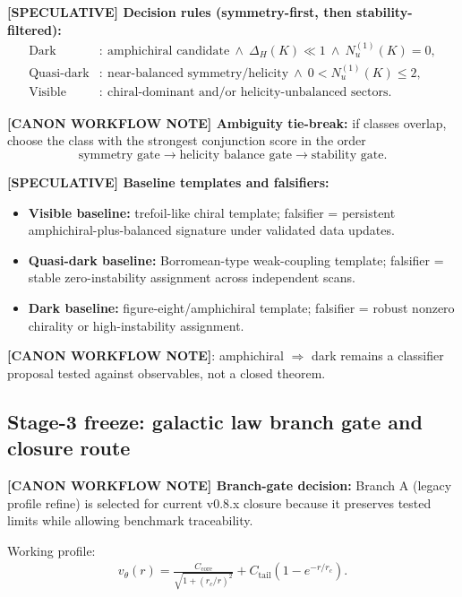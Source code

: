 \textbf{[SPECULATIVE] Decision rules (symmetry-first, then stability-filtered):}
\begin{align}
    \text{Dark}
    &:\ \text{amphichiral candidate}
    \ \wedge\
    \Delta_H(K)\ll 1
    \ \wedge\
    N_u^{(1)}(K)=0,\\
    \text{Quasi-dark}
    &:\ \text{near-balanced symmetry/helicity}
    \ \wedge\
    0 < N_u^{(1)}(K)\le 2,\\
    \text{Visible}
    &:\ \text{chiral-dominant and/or helicity-unbalanced sectors}.
\end{align}

\textbf{[CANON WORKFLOW NOTE] Ambiguity tie-break:}
if classes overlap, choose the class with the strongest conjunction score in the order
\[
\text{symmetry gate} \rightarrow \text{helicity balance gate} \rightarrow \text{stability gate}.
\]

\textbf{[SPECULATIVE] Baseline templates and falsifiers:}
\begin{itemize}
    \item \textbf{Visible baseline:} trefoil-like chiral template; falsifier = persistent amphichiral-plus-balanced signature under validated data updates.
    \item \textbf{Quasi-dark baseline:} Borromean-type weak-coupling template; falsifier = stable zero-instability assignment across independent scans.
    \item \textbf{Dark baseline:} figure-eight/amphichiral template; falsifier = robust nonzero chirality or high-instability assignment.
\end{itemize}

\textbf{[CANON WORKFLOW NOTE]}:
amphichiral $\Rightarrow$ dark remains a classifier proposal tested against observables, not a closed theorem.

\subsection{Stage-3 freeze: galactic law branch gate and closure route}
\textbf{[CANON WORKFLOW NOTE] Branch-gate decision:} Branch A (legacy profile refine) is selected for current v0.8.x closure because it preserves tested limits while allowing benchmark traceability.

Working profile:
\begin{align}
    v_\theta(r)
    =
    \frac{C_{\mathrm{core}}}{\sqrt{1+(r_c/r)^2}}
    +
    C_{\mathrm{tail}}\left(1-e^{-r/r_c}\right).
\end{align}

